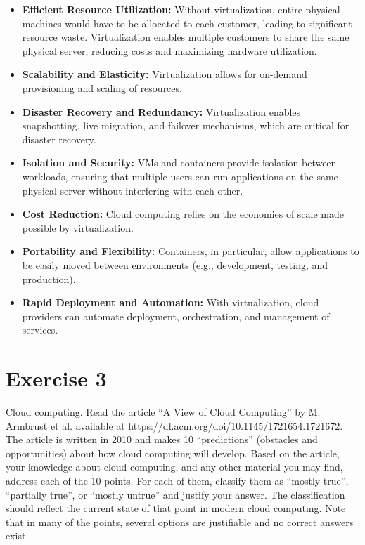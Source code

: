 \documentclass{article}
\newcommand{\exercise}[1]{
    \section*{Exercise #1}
    \markboth{Exercise #1}{}
}
\begin{document}
  \begin{itemize}
    \item \textbf{Efficient Resource Utilization:} Without 
    virtualization, entire physical machines would have to be
    allocated to each customer, leading to significant resource
    waste. Virtualization enables multiple customers to share
    the same physical server, reducing costs and maximizing
    hardware utilization.

    \item \textbf{Scalability and Elasticity:} Virtualization
    allows for on-demand provisioning and scaling of resources.

    \item \textbf{Disaster Recovery and Redundancy:}
    Virtualization enables snapshotting, live migration,
    and failover mechanisms, which are critical for disaster
    recovery.

    \item \textbf{Isolation and Security:} VMs and containers
    provide isolation between workloads, ensuring that multiple
    users can run applications on the same physical server
    without interfering with each other.

    \item \textbf{Cost Reduction:} Cloud computing relies on
    the economies of scale made possible by virtualization.
    
    \item \textbf{Portability and Flexibility:} Containers,
    in particular, allow applications to be easily moved between
    environments (e.g., development, testing, and production).
    
    \item \textbf{Rapid Deployment and Automation:} With
    virtualization, cloud providers can automate deployment,
    orchestration, and management of services.

  \end{itemize}




  \newpage

\exercise{3}
Cloud computing. Read the article “A View of Cloud Computing” by M. Armbrust et al.
available at https://dl.acm.org/doi/10.1145/1721654.1721672. The article is written in 2010
and makes 10 “predictions” (obstacles and opportunities) about how cloud computing will develop.
Based on the article, your knowledge about cloud computing, and any other material you may find,
address each of the 10 points. For each of them, classify them as “mostly true”, “partially true”, or
“mostly untrue” and justify your answer. The classification should reflect the current state of that
point in modern cloud computing. Note that in many of the points, several options are justifiable and
no correct answers exist.
\end{document}
